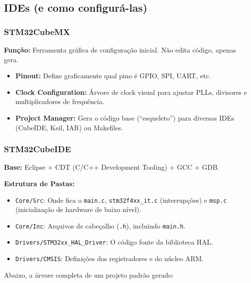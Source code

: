 \documentclass[12pt,a4paper]{article}
\begin{document}
\subsection{IDEs (e como configurá-las)}

\subsubsection{STM32CubeMX}
\textbf{Função:} Ferramenta gráfica de configuração inicial. Não edita código, apenas gera.
\begin{itemize}
    \item \textbf{Pinout:} Define graficamente qual pino é GPIO, SPI, UART, etc.
    \item \textbf{Clock Configuration:} Árvore de clock visual para ajustar PLLs, divisores e multiplicadores de frequência.
    \item \textbf{Project Manager:} Gera o código base (``esqueleto'') para diversas IDEs (CubeIDE, Keil, IAR) ou Makefiles.
\end{itemize}

\subsubsection{STM32CubeIDE}
\textbf{Base:} Eclipse + CDT (C/C++ Development Tooling) + GCC + GDB.

\textbf{Estrutura de Pastas:}
\begin{itemize}
    \item \texttt{Core/Src}: Onde fica o \texttt{main.c}, \texttt{stm32f4xx\_it.c} (interrupções) e \texttt{msp.c} (inicialização de hardware de baixo nível).
    \item \texttt{Core/Inc}: Arquivos de cabeçalho (\texttt{.h}), incluindo \texttt{main.h}.
    \item \texttt{Drivers/STM32xx\_HAL\_Driver}: O código fonte da biblioteca HAL.
    \item \texttt{Drivers/CMSIS}: Definições dos registradores e do núcleo ARM.
\end{itemize}

Abaixo, a árvore completa de um projeto padrão gerado:
\end{document}
